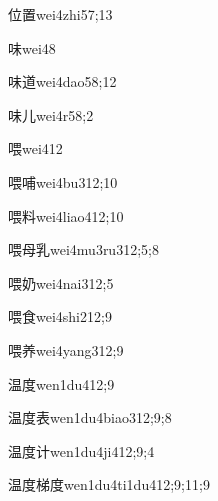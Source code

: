 \begin{verbete}{位置}{wei4zhi5}{7;13}
\end{verbete}
\begin{verbete}{味}{wei4}{8}
\end{verbete}
\begin{verbete}{味道}{wei4dao5}{8;12}
\end{verbete}
\begin{verbete}{味儿}{wei4r5}{8;2}
\end{verbete}
\begin{verbete}{喂}{wei4}{12}
\end{verbete}
\begin{verbete}{喂哺}{wei4bu3}{12;10}
\end{verbete}
\begin{verbete}{喂料}{wei4liao4}{12;10}
\end{verbete}
\begin{verbete}{喂母乳}{wei4mu3ru3}{12;5;8}
\end{verbete}
\begin{verbete}{喂奶}{wei4nai3}{12;5}
\end{verbete}
\begin{verbete}{喂食}{wei4shi2}{12;9}
\end{verbete}
\begin{verbete}{喂养}{wei4yang3}{12;9}
\end{verbete}
\begin{verbete}{温度}{wen1du4}{12;9}
\end{verbete}
\begin{verbete}{温度表}{wen1du4biao3}{12;9;8}
\end{verbete}
\begin{verbete}{温度计}{wen1du4ji4}{12;9;4}
\end{verbete}
\begin{verbete}{温度梯度}{wen1du4ti1du4}{12;9;11;9}
\end{verbete}
